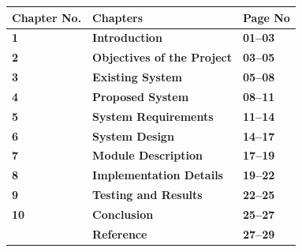 \begin{center}
\renewcommand{\arraystretch}{1.45}
\begin{tabular}{|>{\centering\arraybackslash}m{2.8cm}|>{\centering\arraybackslash}m{7.8cm}|>{\centering\arraybackslash}m{2.8cm}|}
\hline
\textbf{Chapter No.} & \textbf{Chapters} & \textbf{Page No} \\
\hline
\textbf{1} & \textbf{Introduction} & \textbf{01--03} \\
\hline
\textbf{2} & \textbf{Objectives of the Project} & \textbf{03--05} \\
\hline
\textbf{3} & \textbf{Existing System} & \textbf{05--08} \\
\hline
\textbf{4} & \textbf{Proposed System} & \textbf{08--11} \\
\hline
\textbf{5} & \textbf{System Requirements} & \textbf{11--14} \\
\hline
\textbf{6} & \textbf{System Design} & \textbf{14--17} \\
\hline
\textbf{7} & \textbf{Module Description} & \textbf{17--19} \\
\hline
\textbf{8} & \textbf{Implementation Details} & \textbf{19--22} \\
\hline
\textbf{9} & \textbf{Testing and Results} & \textbf{22--25} \\
\hline
\textbf{10} & \textbf{Conclusion} & \textbf{25--27} \\
\hline
 & \textbf{Reference} & \textbf{27--29} \\
\hline
\end{tabular}
\end{center}
\newpage
